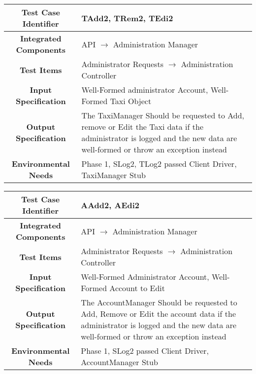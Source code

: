 \documentclass[11pt, a4paper,titlepage]{article}
\begin{document}
	 	\begin{tabularx}{\textwidth}{| c|X|}
	 		\hline \textbf{Test Case Identifier} & TAdd2, TRem2, TEdi2 \\
	 		\hline \textbf{Integrated Components} &  API $\rightarrow $ Administration Manager \\
	 		\hline \textbf{Test Items} &  Administrator Requests  $\rightarrow $ Administration Controller\\
	 		\hline \textbf{Input Specification} &  Well-Formed administrator Account, Well-Formed Taxi Object \\
	 		\hline \textbf{Output Specification} & The TaxiManager Should be requested to Add, remove or Edit the Taxi data if the administrator is logged and the new data are well-formed or throw an exception instead\\
	 		\hline \textbf{Environmental Needs} &  Phase 1, SLog2, TLog2 passed \newline 
	 		Client Driver, TaxiManager Stub\\
	 		\hline
	 	\end{tabularx}
	 	\newline
		 \begin{tabularx}{\textwidth}{| c|X|}
		 	\hline \textbf{Test Case Identifier} & AAdd2, AEdi2 \\
		 	\hline \textbf{Integrated Components} &  API $\rightarrow $ Administration Manager \\
		 	\hline \textbf{Test Items} &  Administrator Requests  $\rightarrow $ Administration Controller\\
		 	\hline \textbf{Input Specification} &  Well-Formed Administrator Account, Well-Formed Account to Edit \\
		 	\hline \textbf{Output Specification} & The AccountManager Should be requested to Add, Remove or Edit the account data if the administrator is logged and the new data are well-formed or throw an exception instead\\
		 	\hline \textbf{Environmental Needs} &  Phase 1, SLog2 passed \newline 
		 	Client Driver, AccountManager Stub\\
		 	\hline
		 \end{tabularx}
		 \newline
		 
\end{document}
